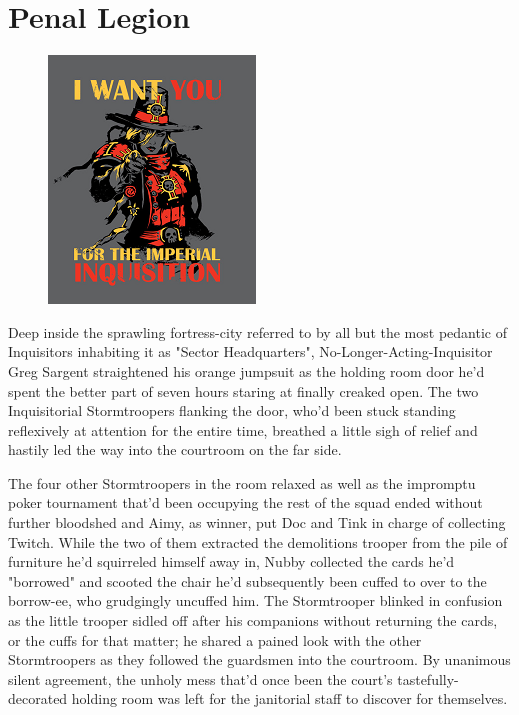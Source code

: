 \chapter{Penal Legion}

\begin{figure}
	\begin{center}
		\includegraphics[width=\figwidth]{pics/21/1.png}
	\end{center}
\end{figure}
Deep inside the sprawling fortress-city referred to by all but the most pedantic of Inquisitors inhabiting it as "Sector Headquarters", No-Longer-Acting-Inquisitor Greg Sargent straightened his orange jumpsuit as the holding room door he'd spent the better part of seven hours staring at finally creaked open. 
The two Inquisitorial Stormtroopers flanking the door, who'd been stuck standing reflexively at attention for the entire time, breathed a little sigh of relief and hastily led the way into the courtroom on the far side.

The four other Stormtroopers in the room relaxed as well as the impromptu poker tournament that'd been occupying the rest of the squad ended without further bloodshed and Aimy, as winner, put Doc and Tink in charge of collecting Twitch. 
While the two of them extracted the demolitions trooper from the pile of furniture he'd squirreled himself away in, Nubby collected the cards he'd "borrowed" and scooted the chair he'd subsequently been cuffed to over to the borrow-ee, who grudgingly uncuffed him. 
The Stormtrooper blinked in confusion as the little trooper sidled off after his companions without returning the cards, or the cuffs for that matter; 
he shared a pained look with the other Stormtroopers as they followed the guardsmen into the courtroom. 
By unanimous silent agreement, the unholy mess that'd once been the court's tastefully-decorated holding room was left for the janitorial staff to discover for themselves.

